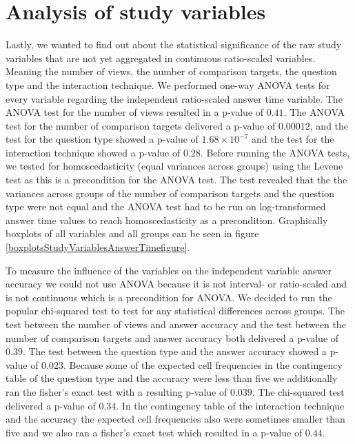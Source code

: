 \section{Analysis of study variables}
Lastly, we wanted to find out about the statistical significance of the raw study variables that are not yet aggregated in continuous ratio-scaled
variables. Meaning the number of views, the number of comparison targets, the question type and the interaction technique. We performed
one-way ANOVA tests for every variable regarding the independent ratio-scaled answer time variable. 
The ANOVA test for the number of views resulted in a p-value of $0.41$.
The ANOVA test for the number of comparison targets delivered a p-value of $0.00012$, and the test for the question type showed a p-value of
$1.68 \times 10^{-7}$ and the test for the interaction technique showed a p-value of $0.28$. Before running the ANOVA tests, we tested for
homoscedasticity (equal variances across groups) using the Levene test as this is a precondition for the ANOVA test. The test revealed that
the the variances across groups of the number of comparison targets and the question type were not equal and the ANOVA test had to be run on
log-transformed answer time values to reach homoscedasticity as a precondition. Graphically boxplots of all variables and all groups can be
seen in figure \ref{boxplotsStudyVariablesAnswerTimefigure}.

To measure the influence of the variables on the independent variable answer accuracy we could not use ANOVA because it is not interval- or
ratio-scaled and is not continuous which is a precondition for ANOVA. We decided to run the popular chi-squared test to test for any statistical differences
across groups. The test between the number of views and answer accuracy and the test between the number of comparison targets and answer accuracy both
delivered a p-value of $0.39$. The test between the question type and the answer accuracy showed a p-value of $0.023$. Because
some of the expected cell frequencies in the contingency table of the question type and the accuracy were less than five we additionally ran the fisher's
exact test with a resulting p-value of $0.039$. The chi-squared test delivered a p-value of $0.34$. In the contingency table of the interaction
technique and the accuracy the expected cell frequencies also were sometimes smaller than five and we also ran a fisher's exact test which resulted in
a p-value of $0.44$.

